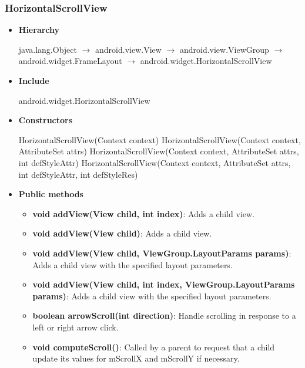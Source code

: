 \documentclass{report}
\begin{document}
\begin{itemize}
    \subsubsection{HorizontalScrollView}
    \begin{itemize}
        \item \textbf{Hierarchy}
            \begin{center}
                java.lang.Object $\to$	android.view.View $\to$	android.view.ViewGroup $\to$	android.widget.FrameLayout $\to$	android.widget.HorizontalScrollView
            \end{center}
        \item \textbf{Include}
            \bigbreak \noindent 
            \begin{javacode}
                android.widget.HorizontalScrollView
            \end{javacode}
        \item \textbf{Constructors}
            \bigbreak \noindent 
            \begin{javacode}
            HorizontalScrollView(Context context)
            HorizontalScrollView(Context context, AttributeSet attrs)
            HorizontalScrollView(Context context, AttributeSet attrs, int defStyleAttr)
            HorizontalScrollView(Context context, AttributeSet attrs, int defStyleAttr, int defStyleRes)
        \end{javacode}
        \item \textbf{Public methods}
            \begin{itemize}
                \item \textbf{void	addView(View child, int index)}: Adds a child view.
                \item \textbf{void	addView(View child)}: Adds a child view.
                \item \textbf{void	addView(View child, ViewGroup.LayoutParams params)}: Adds a child view with the specified layout parameters.
                \item \textbf{void	addView(View child, int index, ViewGroup.LayoutParams params)}: Adds a child view with the specified layout parameters.
                \item \textbf{boolean	arrowScroll(int direction)}: Handle scrolling in response to a left or right arrow click.
                \item \textbf{void	computeScroll()}: Called by a parent to request that a child update its values for mScrollX and mScrollY if necessary.

\end{itemize}
\end{itemize}
\end{itemize}
\end{document}
